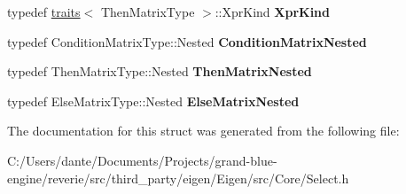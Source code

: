 \begin{DoxyCompactItemize}
typedef \mbox{\hyperlink{struct_eigen_1_1internal_1_1traits}{traits}}$<$ Then\+Matrix\+Type $>$\+::Xpr\+Kind {\bfseries Xpr\+Kind}
\item 
\mbox{\label{struct_eigen_1_1internal_1_1traits_3_01_select_3_01_condition_matrix_type_00_01_then_matrix_type4a832542e824e444643efa2ac02419b2_ab2e9ab45462bbc1d5acf0efd4470df84}} 
typedef Condition\+Matrix\+Type\+::\+Nested {\bfseries Condition\+Matrix\+Nested}
\item 
\mbox{\label{struct_eigen_1_1internal_1_1traits_3_01_select_3_01_condition_matrix_type_00_01_then_matrix_type4a832542e824e444643efa2ac02419b2_a5f974812f22d59116a88af721159cdda}} 
typedef Then\+Matrix\+Type\+::\+Nested {\bfseries Then\+Matrix\+Nested}
\item 
\mbox{\label{struct_eigen_1_1internal_1_1traits_3_01_select_3_01_condition_matrix_type_00_01_then_matrix_type4a832542e824e444643efa2ac02419b2_a78d8b57ded5a7dd4adde5f46675dfd5a}} 
typedef Else\+Matrix\+Type\+::\+Nested {\bfseries Else\+Matrix\+Nested}
\end{DoxyCompactItemize}


The documentation for this struct was generated from the following file\+:\begin{DoxyCompactItemize}
\item 
C\+:/\+Users/dante/\+Documents/\+Projects/grand-\/blue-\/engine/reverie/src/third\+\_\+party/eigen/\+Eigen/src/\+Core/Select.\+h\end{DoxyCompactItemize}

